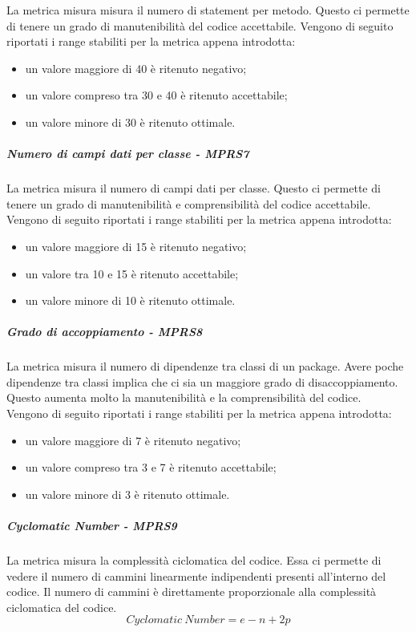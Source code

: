 \documentclass[../PianoDiQualifica.tex]{subfiles}
\begin{document}
			La metrica misura misura il numero di statement per metodo. Questo ci permette di tenere un grado di manutenibilità del codice accettabile.
			Vengono di seguito riportati i range stabiliti per la metrica appena introdotta:
			\begin{itemize}
				\item un valore maggiore di 40 è ritenuto negativo;
				\item un valore compreso tra 30 e 40 è ritenuto accettabile;
				\item un valore minore di 30 è ritenuto ottimale.
			\end{itemize}
			\subparagraph{Numero di campi dati per classe - MPRS7}\label{MPRS7}
			La metrica misura il numero di campi dati per classe. Questo ci permette di tenere un grado di manutenibilità e comprensibilità del codice accettabile.
			Vengono di seguito riportati i range stabiliti per la metrica appena introdotta:
			\begin{itemize}
			\item un valore maggiore di 15 è ritenuto negativo;
			\item un valore tra 10 e 15 è ritenuto accettabile;
			\item un valore minore di 10 è ritenuto ottimale.
			\end{itemize}
			\subparagraph{Grado di accoppiamento - MPRS8}\label{MPRS8}
			La metrica misura il numero di dipendenze tra classi di un package\g. Avere poche dipendenze tra classi implica che ci sia un maggiore grado di disaccoppiamento. Questo aumenta molto la manutenibilità e la comprensibilità del codice.\\
			Vengono di seguito riportati i range stabiliti per la metrica appena introdotta:
			\begin{itemize}
				\item un valore maggiore di 7 è ritenuto negativo;
				\item un valore compreso tra 3 e 7 è ritenuto accettabile;
				\item un valore minore di 3 è ritenuto ottimale.
			\end{itemize}
			\subparagraph{Cyclomatic Number - MPRS9}\label{MPRS9}
			La metrica misura la complessità ciclomatica del codice. Essa ci permette di vedere il numero di cammini linearmente indipendenti presenti all'interno del codice. Il numero di cammini è direttamente proporzionale alla complessità ciclomatica del codice.
			\begin{equation}
			Cyclomatic \ Number = e - n + 2p 
			\end{equation}
\end{document}
